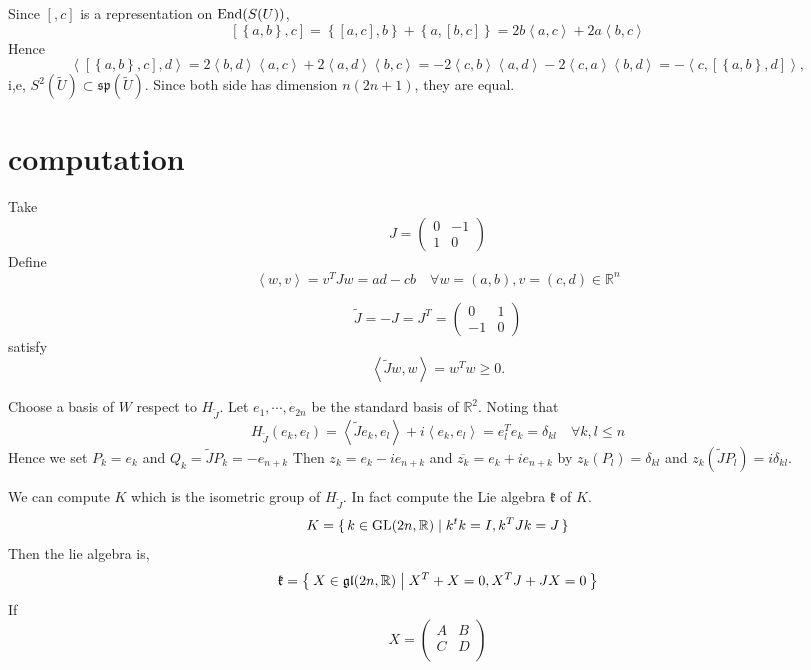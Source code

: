 \documentclass[12pt]{amsart}
\def\End{{\rm End}}
\def\bR{{\mathbb{R}}}
\def\sp{{\mathfrak{sp}}}
\def\inn#1#2{\left\langle{#1},{#2}\right\rangle}
\def\tJ{{\widetilde{J}}}
\def\agl{\mathfrak{gl}}
\def\fkk{\mathfrak{k}}
\def\GL{\mathrm{GL}}
\def\tU{{\widetilde{U}}}
\def\cmm#1#2{\left[{#1},{#2}\right]}
\def\acmm#1#2{\left\{{#1},{#2}\right\}}
\begin{document}
Since $[,c]$ is a representation on $\End(S(U))$, 
\[
\cmm{\acmm{a}{b}}{c}
= \acmm{\cmm{a}{c}}{b} + \acmm{a}{\cmm{b}{c}}
= 2b\inn{a}{c} + 2a \inn{b}{c}
\]
Hence
\[
\inn{\cmm{\acmm{a}{b}}{c}}{d}
= 2\inn{b}{d}\inn{a}{c} + 2\inn{a}{d}\inn{b}{c}
= -2\inn{c}{b}\inn{a}{d} -2\inn{c}{a}\inn{b}{d}
=-\inn{c}{\cmm{\acmm{a}{b}}{d}},
\]
i,e, $S^2(\tU) \subset \sp(\tU)$. Since both side has dimension $n(2n+1)$,
they are equal. 

\section{computation}
Take 
\[
J = \begin{pmatrix} 0 & -1\\1 & 0
\end{pmatrix}
\]
Define 
\[
\inn{w}{v} = v^T J w = ad - cb \quad \forall w = (a,b), v = (c,d) \in \bR^n
\]

\[
\tJ = -J = J^T = 
\begin{pmatrix}
  0 & 1 \\ -1 & 0
\end{pmatrix}
\]
satisfy 
\[
\inn{\tJ w}{w} = w^T w \geq 0.
\]

Choose a basis of $W$ respect to $H_\tJ$.
Let $e_1, \cdots, e_{2n}$ be the standard basis of $\bR^2$.
Noting that 
\[
H_\tJ(e_k,e_l) = \inn{\tJ e_k}{e_l}+i\inn{e_k}{e_l}
= e_l^T e_k =\delta_{kl} \quad \forall k,l \leq n
\]
Hence we set $P_k = e_k$ and $Q_k = \tJ P_k = -e_{n+k}$
Then $z_k = e_k - i e_{n+k}$ and $\overline{z_k} = e_k +i e_{n+k}$
by $z_k(P_l) = \delta_{kl}$ and $z_k(\tJ P_l)= i\delta_{kl}$.

We can compute $K$ which is the isometric group of $H_\tJ$.
In fact compute the Lie algebra $\fkk$ of $K$. 
\[
K = \set{k  \in \GL(2n,\bR)|k^tk = I, k^TJk = J }
\]
Then the lie algebra is,
\[
\fkk = \Set{X\in \agl(2n,\bR)|X^T + X  = 0, X^TJ + JX = 0}
\]
If
\[
X = \begin{pmatrix} A & B \\ C & D \\
\end{pmatrix}
\]
\end{document}
